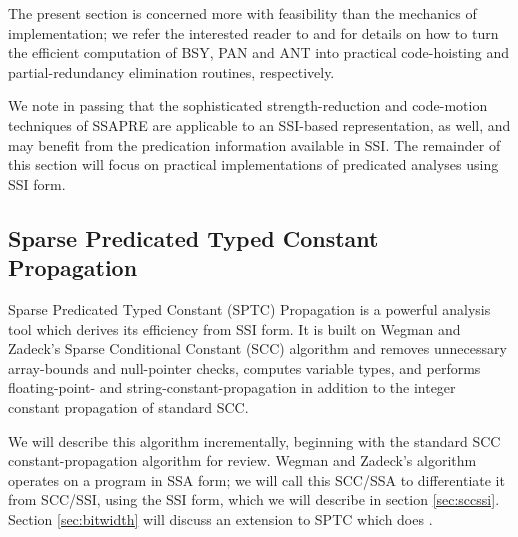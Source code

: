 \documentclass[12pt,titlepage,twoside]{article}
\newcommand{\ignore}[1]{}
\begin{document}
The present section is concerned more with feasibility than the
mechanics of implementation; we refer the interested reader to
\cite{offner95} and \cite{johnson93:dfg} for details on how to turn
the efficient computation of BSY, PAN and ANT into practical
code-hoisting and partial-redundancy elimination routines, respectively.

We note in passing that the sophisticated strength-reduction and code-motion
techniques of SSAPRE \cite{kennedy98:strength} are applicable to an SSI-based
representation, as well, and may benefit from the predication
information available in SSI.  The remainder of this section will
focus on practical implementations of predicated analyses using SSI form.

\subsection{Sparse Predicated Typed Constant Propagation}
Sparse Predicated Typed Constant (SPTC) Propagation is a powerful
analysis tool which
derives its efficiency from SSI form.  It is built on Wegman and
Zadeck's Sparse Conditional Constant (SCC) algorithm
\cite{wegman91:scc} and removes unnecessary array-bounds and
null-pointer checks, computes variable types, and performs
floating-point- and string-constant-propagation in addition to the
integer constant propagation of standard SCC.
\ignore{\footnote{It also washes
the dishes and does the laundry.}}

We will describe this algorithm incrementally, beginning with the
standard SCC constant-propagation algorithm for review.
Wegman and Zadeck's algorithm operates on a program in SSA form; we will
call this SCC/SSA to differentiate it from SCC/SSI, using the SSI
form, which we will describe in section \ref{sec:sccssi}. Section
\vref{sec:bitwidth} will discuss an extension to SPTC which does
.
\end{document}
